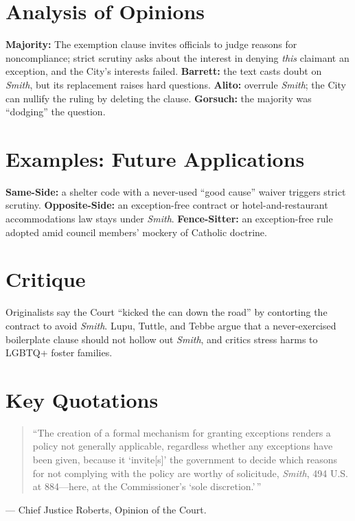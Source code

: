 \documentclass[12pt]{article}
\begin{document}
\section{Analysis of Opinions}
\textbf{Majority:} The exemption clause invites officials to judge reasons for noncompliance; strict scrutiny asks about the interest in denying \emph{this} claimant an exception, and the City's interests failed. \textbf{Barrett:} the text casts doubt on \textit{Smith}, but its replacement raises hard questions. \textbf{Alito:} overrule \textit{Smith}; the City can nullify the ruling by deleting the clause. \textbf{Gorsuch:} the majority was ``dodging'' the question.

\section{Examples: Future Applications}
\textbf{Same-Side:} a shelter code with a never-used ``good cause'' waiver triggers strict scrutiny. \textbf{Opposite-Side:} an exception-free contract or hotel-and-restaurant accommodations law stays under \textit{Smith}. \textbf{Fence-Sitter:} an exception-free rule adopted amid council members' mockery of Catholic doctrine.

\section{Critique}
Originalists say the Court ``kicked the can down the road'' by contorting the contract to avoid \textit{Smith}. Lupu, Tuttle, and Tebbe argue that a never-exercised boilerplate clause should not hollow out \textit{Smith}, and critics stress harms to LGBTQ+ foster families.

\section{Key Quotations}
\begin{quote}
``The creation of a formal mechanism for granting exceptions renders a policy not generally applicable, regardless whether any exceptions have been given, because it `invite[s]' the government to decide which reasons for not complying with the policy are worthy of solicitude, \textit{Smith}, 494 U.S. at 884---here, at the Commissioner's `sole discretion.'\,''
\end{quote}
\noindent --- Chief Justice Roberts, Opinion of the Court.
\end{document}
